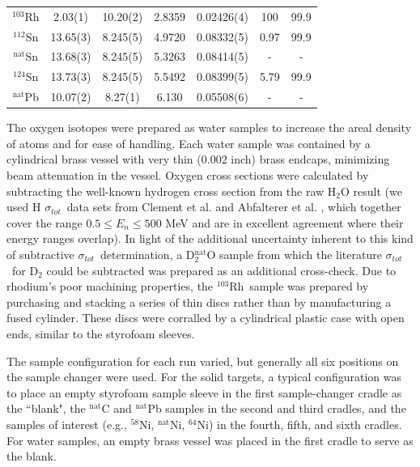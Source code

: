 \documentclass[twocolumn,secnumarabic,amssymb, nobibnotes, aps, prl,
superscriptaddress, nobalancelastpage]{revtex4}
\newcommand{\tot}{\ensuremath{\sigma_{tot}}}
\newcommand{\rhThree}{\ensuremath{^{103}}R\lowercase{h}}
\begin{document}
\begin{table}[ht]
\begin{center}
\begin{tabular}{ c c c c c c c }
            $^{103}$Rh & 2.03(1) & 10.20(2) & 2.8359 & 0.02426(4) & 100 & 99.9\\

            $^{112}$Sn & 13.65(3) & 8.245(5) &
            4.9720 & 0.08332(5) & 0.97 & 99.9\\
            $^{\text{nat}}$Sn & 13.68(3) & 8.245(5) &
            5.3263 & 0.08414(5) & - & -\\
            $^{124}$Sn & 13.73(3) & 8.245(5) &
            5.5492 & 0.08399(5) & 5.79 & 99.9\\

            $^{\text{nat}}$Pb & 10.07(2) & 8.27(1) & 6.130 &
            0.05508(6) & - & -\\

            \hline
        \end{tabular}
    \end{center}
\end{table}

The oxygen isotopes were prepared as water samples to increase the areal density
of atoms and for ease of handling. Each water sample was contained by a
cylindrical brass vessel with very thin (0.002 inch) brass endcaps, minimizing
beam attenuation in the vessel. Oxygen cross sections were calculated by
subtracting the well-known hydrogen cross section from the raw H$_{2}$O result
(we used H \tot\  data sets from Clement et al. \cite{Clement1972} and Abfalterer
et al. \cite{Abfalterer2001}, which together cover the range $0.5 \leq E_n \leq 500$ MeV
and are in excellent agreement where their energy ranges overlap). In light of
the additional uncertainty inherent to this kind of subtractive \tot\ determination,
a D$_{2}^{\text{nat}}$O sample from which the literature \tot\  for
D$_{2}$ could be subtracted was prepared as an additional cross-check. Due to
rhodium's poor machining properties, the \rhThree\ sample
was prepared by purchasing and stacking a series of thin discs rather than by
manufacturing a fused cylinder. These discs were corralled
by a cylindrical plastic case with open ends, similar to the styrofoam sleeves.

The sample configuration for each run varied, but generally all six positions on
the sample changer were used. For the solid targets, a typical configuration was
to place an empty styrofoam sample sleeve in the first sample-changer cradle as
the ``blank", the $^{\text{nat}}$C and $^{\text{nat}}$Pb samples in the second and third
cradles, and the samples of interest (e.g., $^{58}$Ni, $^{\text{nat}}$Ni, $^{64}$Ni) in
the fourth, fifth, and sixth cradles. For water samples, an empty brass vessel
was placed in the first cradle to serve as the blank.
\end{document}
